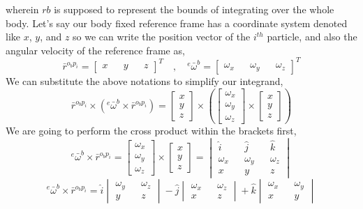 wherein $rb$ is supposed to represent the bounds of integrating over the whole body.
Let's say our body fixed reference frame has a coordinate system denoted like $x$, $y$, and $z$ so we can write the position vector of the $i^{th}$ particle, and also the angular velocity of the reference frame as,
$$\bar{r}^{o_{b}p_{i}} = \begin{bmatrix}
x && y && z
\end{bmatrix}^{T}\quad,\quad {}^{e}\bar{\omega}^{b} = \begin{bmatrix}
\omega_{x} && \omega_{y} && \omega_{z}
\end{bmatrix}^{T}$$
We can substitute the above notations to simplify our integrand,
\begin{equation}\bar{r}^{o_{b}p_{i}}\times\left({}^{e}\bar{\omega}^{b}\times\bar{r}^{o_{b}p_{i}}\right) = 
\begin{bmatrix}
x \\ y \\ z
\end{bmatrix} \times \left(
\begin{bmatrix}
\omega_{x} \\ \omega_{y} \\ \omega_{z}
\end{bmatrix} \times \begin{bmatrix}
x \\ y \\ z
\end{bmatrix}\right) \label{Inertia Tensor Primitive 1}\end{equation}
We are going to perform the cross product within the brackets first,
$${}^{e}\bar{\omega}^{b}\times\bar{r}^{o_{b}p_{i}} = \begin{bmatrix}
\omega_{x} \\ \omega_{y} \\ \omega_{z}
\end{bmatrix} \times \begin{bmatrix}
x \\ y \\ z
\end{bmatrix} = \begin{vmatrix}
\hat{i} && \hat{j} && \hat{k} \\
\omega_{x} && \omega_{y} && \omega_{z} \\
x && y && z
\end{vmatrix}$$
$${}^{e}\bar{\omega}^{b}\times\bar{r}^{o_{b}p_{i}} = 
\hat{i}\begin{vmatrix}
    \omega_{y} && \omega_{z} \\
    y && z
\end{vmatrix}
-
\hat{j}\begin{vmatrix}
    \omega_{x} && \omega_{z} \\
    x && z
\end{vmatrix}
+
\hat{k}\begin{vmatrix}
    \omega_{x} && \omega_{y} \\
    x && y
\end{vmatrix}$$
